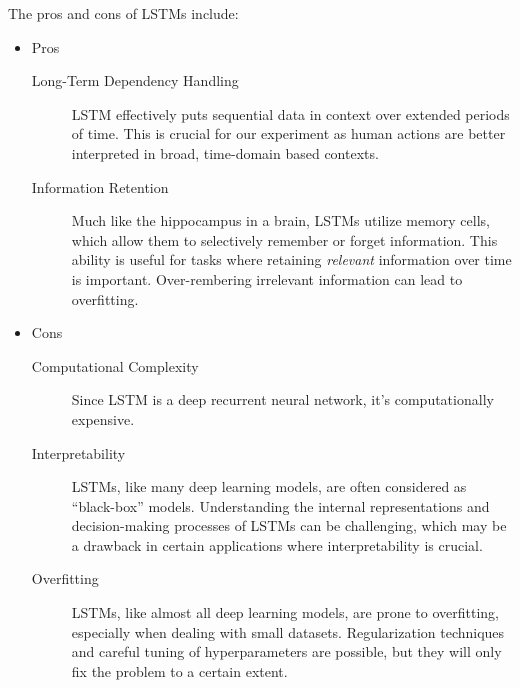 \documentclass[letterpaper]{article} %
\begin{document}
The pros and cons of LSTMs include:
\begin{itemize}
  \item Pros
  \begin{description}
    \item[Long-Term Dependency Handling]
      LSTM effectively puts sequential data in context
      over extended periods of time.
      This is crucial for our experiment
      as human actions are better interpreted
      in broad, time-domain based contexts.
    \item[Information Retention]
      Much like the hippocampus in a brain, 
      LSTMs utilize memory cells, which allow them to 
      selectively remember or forget information. 
      This ability is useful for tasks where 
      retaining \emph{relevant} information over time is important.
      Over-rembering irrelevant information can lead to overfitting.
  \end{description} 
  \item Cons
  \begin{description}
    \item[Computational Complexity]
      Since LSTM is a deep recurrent neural network,
      it's computationally expensive.
    \item[Interpretability]
      LSTMs, like many deep learning models, 
      are often considered as ``black-box'' models. 
      Understanding the internal representations and 
      decision-making processes of LSTMs can be challenging, 
      which may be a drawback in certain applications where interpretability is crucial.
    \item[Overfitting]
      LSTMs, like almost all deep learning models, 
      are prone to overfitting, especially when dealing with small datasets. 
      Regularization techniques and careful tuning of hyperparameters are possible,
      but they will only fix the problem to a certain extent.
  \end{description} 
\end{itemize}
\end{document}

